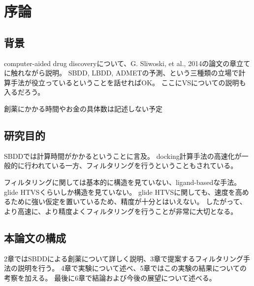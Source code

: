 \chapter{序論}
\section{背景}
computer-aided drug discoveryについて、G. Sliwoski, et al., 2014の論文の章立てに触れながら説明。
SBDD, LBDD, ADMETの予測、という三種類の立場で計算手法が役立っているということを話せればOK。
ここにVSについての説明も入るだろう。

創薬にかかる時間やお金の具体数は記述しない予定

\section{研究目的}
SBDDでは計算時間がかかるということに言及。
docking計算手法の高速化が一般的に行われている一方、フィルタリングを行うということもされている。

フィルタリングに関しては基本的に構造を見ていない、ligand-basedな手法。glide HTVSくらいしか構造を見ていない。
glide HTVSに関しても、速度を高めるために強い仮定を置いているため、精度が十分とはいえない。
したがって、より高速に、より精度よくフィルタリングを行うことが非常に大切となる。

\section{本論文の構成}
2章ではSBDDによる創薬について詳しく説明、3章で提案するフィルタリング手法の説明を行う。
4章で実験について述べ、5章ではこの実験の結果についての考察を加える。
最後に6章で結論および今後の展望について述べる。